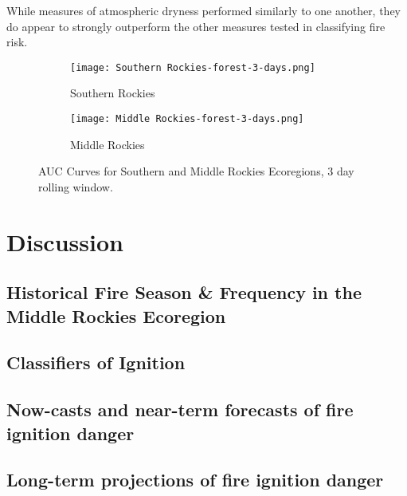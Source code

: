 \documentclass{article}
\begin{document}
While measures of atmospheric dryness performed similarly to one another, they do appear to strongly outperform the other measures tested in classifying fire risk.   

\begin{figure}[ht]
  \centering
  \begin{subfigure}{.5\textwidth}
    \centering
    \texttt{[image: Southern Rockies-forest-3-days.png]}
    \caption{Southern Rockies}
    \label{fig:sr-auc}
  \end{subfigure}%
  \begin{subfigure}{.5\textwidth}
    \centering
    \texttt{[image: Middle Rockies-forest-3-days.png]}
    \caption{Middle Rockies}
    \label{fig:mr-auc}
  \end{subfigure}
  \caption{AUC Curves for Southern and Middle Rockies Ecoregions, 3 day rolling window.}
  \label{fig:auc}
\end{figure}

\section{Discussion}
\subsection{Historical Fire Season \& Frequency in the Middle Rockies Ecoregion}
\subsection{Classifiers of Ignition}
\subsection{Now-casts and near-term forecasts of fire ignition danger}
\subsection{Long-term projections of fire ignition danger}

\printbibliography[
heading=bibintoc,
title={Bibliography}
]
\end{document}
